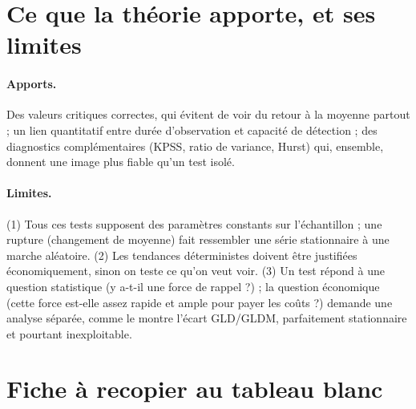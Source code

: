 \section{Ce que la théorie apporte, et ses limites}

\paragraph{Apports.} Des valeurs critiques correctes, qui évitent de voir du retour à la moyenne partout ; un lien quantitatif entre durée d'observation et capacité de détection ; des diagnostics complémentaires (KPSS, ratio de variance, Hurst) qui, ensemble, donnent une image plus fiable qu'un test isolé.

\paragraph{Limites.} (1) Tous ces tests supposent des paramètres constants sur l'échantillon ; une rupture (changement de moyenne) fait ressembler une série stationnaire à une marche aléatoire. (2) Les tendances déterministes doivent être justifiées économiquement, sinon on teste ce qu'on veut voir. (3) Un test répond à une question statistique (\og y a-t-il une force de rappel ?\fg) ; la question économique (\og cette force est-elle assez rapide et ample pour payer les coûts ?\fg) demande une analyse séparée, comme le montre l'écart GLD/GLDM, parfaitement stationnaire et pourtant inexploitable.

\section{Fiche à recopier au tableau blanc}

